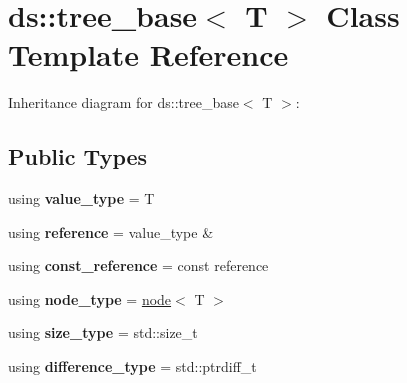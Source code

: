 \hypertarget{classds_1_1tree__base}{}\section{ds\+:\+:tree\+\_\+base$<$ T $>$ Class Template Reference}
\label{classds_1_1tree__base}


Inheritance diagram for ds\+:\+:tree\+\_\+base$<$ T $>$\+:
\subsection*{Public Types}
\begin{DoxyCompactItemize}
\item 
using {\bfseries value\+\_\+type} = T\hypertarget{classds_1_1tree__base_ae0c5f5979dd30d5bb66cec2c047cb62a}{}\label{classds_1_1tree__base_ae0c5f5979dd30d5bb66cec2c047cb62a}

\item 
using {\bfseries reference} = value\+\_\+type \&\hypertarget{classds_1_1tree__base_aa0c8cec9b58bda7a1fe35e540c4baa9e}{}\label{classds_1_1tree__base_aa0c8cec9b58bda7a1fe35e540c4baa9e}

\item 
using {\bfseries const\+\_\+reference} = const reference\hypertarget{classds_1_1tree__base_a26a8463da9d5a4f3d8b3b9295397ec0e}{}\label{classds_1_1tree__base_a26a8463da9d5a4f3d8b3b9295397ec0e}

\item 
using {\bfseries node\+\_\+type} = \hyperlink{classds_1_1node}{node}$<$ T $>$\hypertarget{classds_1_1tree__base_a9b91f60cfcede962c0ce2af11f44cab2}{}\label{classds_1_1tree__base_a9b91f60cfcede962c0ce2af11f44cab2}

\item 
using {\bfseries size\+\_\+type} = std\+::size\+\_\+t\hypertarget{classds_1_1tree__base_a2d18d43213a92bc031beec25cb28f59c}{}\label{classds_1_1tree__base_a2d18d43213a92bc031beec25cb28f59c}

\item 
using {\bfseries difference\+\_\+type} = std\+::ptrdiff\+\_\+t\hypertarget{classds_1_1tree__base_a1dad0adf4489ef2b3547e38ec81e7e42}{}\label{classds_1_1tree__base_a1dad0adf4489ef2b3547e38ec81e7e42}

\end{DoxyCompactItemize}
